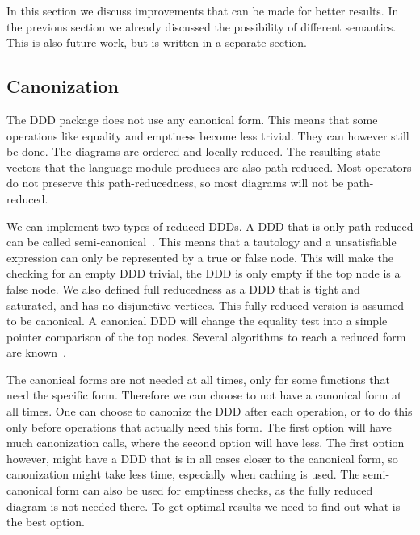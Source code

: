 In this section we discuss improvements that can be made for better results. In the previous section we already discussed the possibility of different semantics. This is also future work, but is written in a separate section.

\subsection{Canonization}
The DDD package does not use any canonical form. This means that some operations like equality and emptiness become less trivial. They can however still be done. The diagrams are ordered and locally reduced. The resulting state-vectors that the language module produces are also path-reduced. Most operators do not preserve this path-reducedness, so most diagrams will not be path-reduced. 

We can implement two types of reduced DDDs. A DDD that is only path-reduced can be called semi-canonical~\cite{ddds}. This means that a tautology and a unsatisfiable expression can only be represented by a true or false node. This will make the checking for an empty DDD trivial, the DDD is only empty if the top node is a false node. We also defined full reducedness as a DDD that is tight and saturated, and has no disjunctive vertices. This fully reduced version is assumed to be canonical. A canonical DDD will change the equality test into a simple pointer comparison of the top nodes.
Several algorithms to reach a reduced form are known~\cite{ddd-mt-98}.

The canonical forms are not needed at all times, only for some functions that need the specific form. Therefore we can choose to not have a canonical form at all times. One can choose to canonize the DDD after each operation, or to do this only before operations that actually need this form. The first option will have much canonization calls, where the second option will have less. The first option however, might have a DDD that is in all cases closer to the canonical form, so canonization might take less time, especially when caching is used. The semi-canonical form can also be used for emptiness checks, as the fully reduced diagram is not needed there. To get optimal results we need to find out what is the best option.

